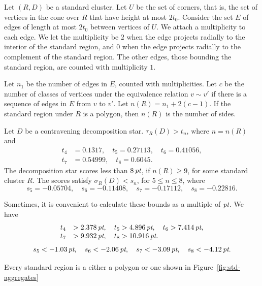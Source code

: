 Let $(R,D)$ be a standard cluster. Let $U$ be the set of corners,
that is, the set of vertices in the cone over $R$ that have height
at most $2t_0$.  Consider the set $E$ of edges of length at most
$2t_0$ between vertices of $U$. We attach a multiplicity to each
edge. We let the multiplicity be $2$ when the edge projects
radially to the interior of the standard region, and $0$ when the
edge projects radially to the complement of the standard region.
The other edges, those bounding the standard region, are counted
with multiplicity $1$.

Let $n_1$ be the number of edges in $E$, counted with multiplicities.
Let $c$ be the number of classes of vertices under the equivalence
relation $v\sim v'$ if there is a sequence of edges in $E$ from $v$ to
$v'$. Let $n(R)=n_1+2(c-1)$. If the standard region under $R$ is a
polygon, then $n(R)$ is the number of sides.

\begin{theorem}
    \label{thm:the-main-theorem}
    Let $D$ be a contravening decomposition star.
$\tau_R(D) > t_n$, where $n=n(R)$ and
    $$
    \begin{array}{lll}
    t_4&=0.1317,\quad t_5=0.27113,\quad
    t_6=0.41056,\\
    t_7&=0.54999,\quad t_8=0.6045.
    \end{array}
    $$
The decomposition star scores less than $8\,\hbox{\it pt}$, if $n(R)\ge 9$,
for some standard cluster $R$. The scores satisfy
$\sigma_R(D)<s_n$, for $5\le n\le 8$, where
    $$
    s_5=-0.05704,\quad s_6=-0.11408,\quad
    s_7=-0.17112,\quad s_8=-0.22816.
    $$
\end{theorem}

Sometimes, it is convenient to calculate these bounds as a multiple
of $\hbox{\it pt}$.  We have
    $$
    \begin{array}{lll}
    t_4&>2.378\,\hbox{\it pt},\quad t_5>4.896\,\hbox{\it pt},\quad
    t_6>7.414\,\hbox{\it pt},\\
    t_7&>9.932\,\hbox{\it pt},\quad
    t_8>10.916\,\hbox{\it pt}.
    \end{array}
    $$
    $$
    s_5 < -1.03\,\hbox{\it pt},\quad s_6<-2.06\,\hbox{\it pt},\quad
    s_7<-3.09\,\hbox{\it pt},\quad s_8<-4.12\,\hbox{\it pt}.
    $$




\begin{corollary}
    \label{cor:std-aggregate-list}
Every standard region is a either a polygon or one shown in
Figure~\ref{fig:std-aggregates}
\end{corollary}



